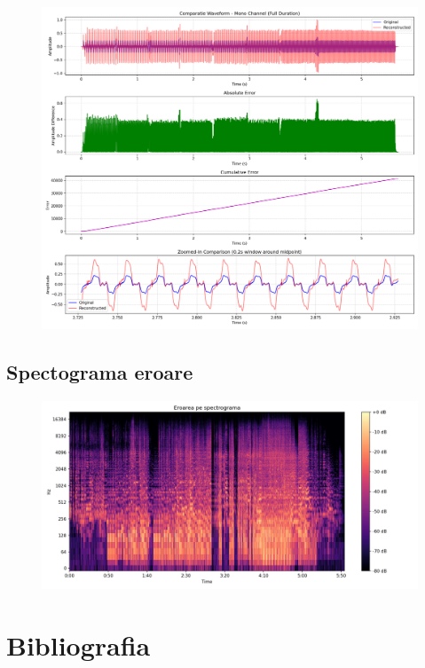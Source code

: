 \documentclass[12pt]{article}
\begin{document}
\begin{figure}[h!]
    \centering
    \includegraphics[width=1\textwidth]{waveform_comparison.png}
\end{figure}

\newpage

\subsection{Spectograma eroare}

\begin{figure}[h!]
    \centering
    \includegraphics[width=1\textwidth]{spectograma_eroare.jpeg}
\end{figure}

\section{Bibliografia}
\end{document}
